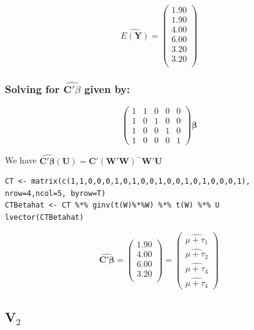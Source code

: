 \documentclass[11pt]{article}
\begin{document}
\[
\hat{E(\mathbf{Y})} =
\begin{pmatrix}{}
  1.90 \\ 
  1.90 \\ 
  4.00 \\ 
  6.00 \\ 
  3.20 \\ 
  3.20 \\ 
  \end{pmatrix}
\]
\subsubsection{Solving for $\hat{\mathbf{C}'\beta}$ given by:}
\label{sec-2-1-2}


\[
\begin{pmatrix}
1 & 1 & 0 & 0 & 0 \\
1 & 0 & 1 & 0 & 0 \\
1 & 0 & 0 & 1 & 0 \\
1 & 0 & 0 & 0 & 1 
\end{pmatrix}\mathbf{\beta}
\]

We have $\hat{\mathbf{C'\beta}}(\mathbf{U}) = \mathbf{C}'(\mathbf{W}'\mathbf{W})^{-}\mathbf{W}'\mathbf{U}$


\begin{verbatim}
CT <- matrix(c(1,1,0,0,0,1,0,1,0,0,1,0,0,1,0,1,0,0,0,1), nrow=4,ncol=5, byrow=T)
CTBetahat <- CT %*% ginv(t(W)%*%W) %*% t(W) %*% U
lvector(CTBetahat)
\end{verbatim}

\[
\hat{\mathbf{C}'\mathbf{\beta}} =
\begin{pmatrix}{}
  1.90 \\ 
  4.00 \\ 
  6.00 \\ 
  3.20 \\ 
  \end{pmatrix} =
\begin{pmatrix}
\widehat{\mu + \tau_1} \\
\widehat{\mu + \tau_2} \\
\widehat{\mu + \tau_3} \\
\widehat{\mu + \tau_4}
\end{pmatrix}
\]
\subsection{V$_2$}
\label{sec-2-2}
\end{document}
